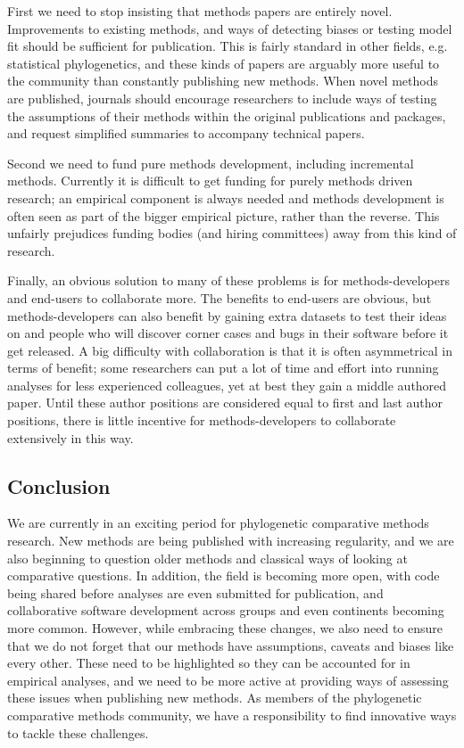 \documentclass[a4paper,12pt]{article}
\begin{document}
    First we need to stop insisting that methods papers are entirely novel. 
    Improvements to existing methods, and ways of detecting biases or testing model fit should be sufficient for publication.
    This is fairly standard in other fields, e.g. statistical phylogenetics, and these kinds of papers are arguably more useful to the community than constantly publishing new methods.
    When novel methods are published, journals should encourage researchers to include ways of testing the assumptions of their methods within the original publications and packages, and request simplified summaries to accompany technical papers.

    Second we need to fund pure methods development, including incremental methods. 
    Currently it is difficult to get funding for purely methods driven research; an empirical component is always needed and methods development is often seen as part of the bigger empirical picture, rather than the reverse. 
    This unfairly prejudices funding bodies (and hiring committees) away from this kind of research. 

    Finally, an obvious solution to many of these problems is for methods-developers and end-users to collaborate more. 
    The benefits to end-users are obvious, but methods-developers can also benefit by gaining extra datasets to test their ideas on and people who will discover corner cases and bugs in their software before it get released. 
    A big difficulty with collaboration is that it is often asymmetrical in terms of benefit; some researchers can put a lot of time and effort into running analyses for less experienced colleagues, yet at best they gain a middle authored paper. 
    Until these author positions are considered equal to first and last author positions, there is little incentive for methods-developers to collaborate extensively in this way.

  \subsection{Conclusion}
    We are currently in an exciting period for phylogenetic comparative methods research.
    New methods are being published with increasing regularity, and we are also beginning to question older methods and classical ways of looking at comparative questions. 
    In addition, the field is becoming more open, with code being shared before analyses are even submitted for publication, and collaborative software development across groups and even continents becoming more common.
    However, while embracing these changes, we also need to ensure that we do not forget that our methods have assumptions, caveats and biases like every other. 
    These need to be highlighted so they can be accounted for in empirical analyses, and we need to be more active at providing ways of assessing these issues when publishing new methods.
    As members of the phylogenetic comparative methods community, we have a responsibility to find innovative ways to tackle these challenges. 
\end{document}
